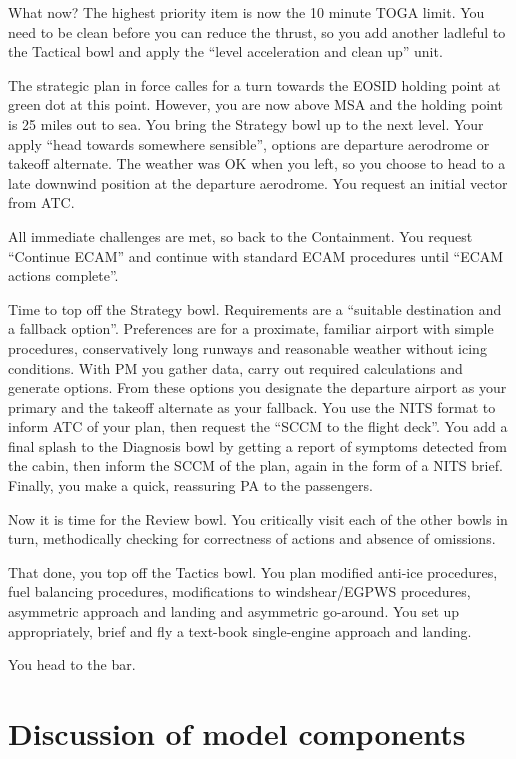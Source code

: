 \documentclass[a5paper,11pt,titlepage]{article}
\begin{document}
What now? The highest priority item is now the 10 minute TOGA limit. You
need to be clean before you can reduce the thrust, so you add another
ladleful to the Tactical bowl and apply the ``level acceleration and clean
up'' unit.

The strategic plan in force calles for a turn towards the EOSID holding
point at green dot at this point. However, you are now above MSA and the
holding point is 25 miles out to sea. You bring the Strategy bowl up to
the next level. Your apply ``head towards somewhere sensible'', options
are departure aerodrome or takeoff alternate. The weather was OK when
you left, so you choose to head to a late downwind position at the
departure aerodrome. You request an initial vector from ATC.

All immediate challenges are met, so back to the Containment. You
request ``Continue ECAM'' and continue with standard ECAM procedures
until ``ECAM actions complete''.

Time to top off the Strategy bowl. Requirements are a ``suitable
destination and a fallback option''. Preferences are for a proximate,
familiar airport with simple procedures, conservatively long runways and
reasonable weather without icing conditions. With PM you gather data,
carry out required calculations and generate options. From these options
you designate the departure airport as your primary and the takeoff
alternate as your fallback. You use the NITS format to inform ATC of
your plan, then request the ``SCCM to the flight deck''. You add a final
splash to the Diagnosis bowl by getting a report of symptoms detected
from the cabin, then inform the SCCM of the plan, again in the form of a
NITS brief. Finally, you make a quick, reassuring PA to the passengers.

Now it is time for the Review bowl. You critically visit each of the
other bowls in turn, methodically checking for correctness of actions
and absence of omissions.

That done, you top off the Tactics bowl. You plan modified anti-ice
procedures, fuel balancing procedures, modifications to windshear/EGPWS
procedures, asymmetric approach and landing and asymmetric
go-around. You set up appropriately, brief and fly a text-book
single-engine approach and landing.

You head to the bar.

\section{Discussion of model components}
\end{document}
